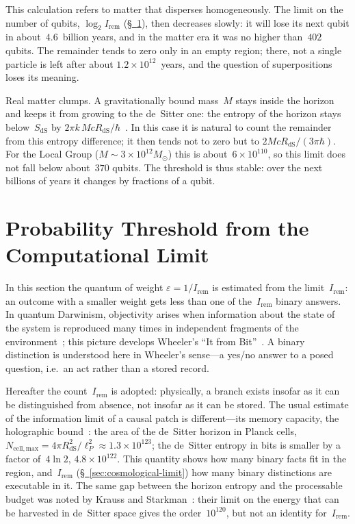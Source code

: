 \documentclass[11pt,a4paper]{article}
\newcommand{\Ost}{I_{\mathrm{rem}}}
\begin{document}
This calculation refers to matter that disperses homogeneously. The limit on the number of qubits, $\log_2\Ost$ (\hyperref[sec:computational]{\S~\ref*{sec:computational}}), then decreases slowly: it will lose its next qubit in about~$4.6$~billion years, and in the matter era it was no higher than~$402$ qubits. The remainder tends to zero only in an empty region; there, not a single particle is left after about $1.2\times10^{12}$~years, and the question of superpositions loses its meaning.

Real matter clumps. A gravitationally bound mass~$M$ stays inside the horizon and keeps it from growing to the de~Sitter one: the entropy of the horizon stays below~$S_{\mathrm{dS}}$ by $2\pi k\,McR_{\mathrm{dS}}/\hbar$~\cite{bousso2002}. In this case it is natural to count the remainder from this entropy difference; it then tends not to zero but to $2McR_{\mathrm{dS}}/(3\pi\hbar)$. For the Local Group ($M\sim3\times10^{12}M_\odot$) this is about~$6\times10^{110}$, so this limit does not fall below about~$370$ qubits. The threshold is thus stable: over the next billions of years it changes by fractions of a qubit.

\section{Probability Threshold from the Computational Limit}
\label{sec:computational}

In this section the quantum of weight $\varepsilon=1/\Ost$ is estimated from the limit~$\Ost$: an outcome with a smaller weight gets less than one of the~$\Ost$ binary answers. In quantum Darwinism, objectivity arises when information about the state of the system is reproduced many times in independent fragments of the environment~\cite{zurek2009}; this picture develops Wheeler's ``It from Bit''~\cite{wheeler1989}. A binary distinction is understood here in Wheeler's sense---a yes/no answer to a posed question, i.e.\ an act rather than a stored record.

Hereafter the count~$\Ost$ is adopted: physically, a branch exists insofar as it can be distinguished from absence, not insofar as it can be stored. The usual estimate of the information limit of a causal patch is different---its memory capacity, the holographic bound~\cite{bousso2002}: the area of the de~Sitter horizon in Planck cells, $N_{\mathrm{cell,max}}=4\pi R_{\mathrm{dS}}^2/\ell_P^2\approx1.3\times10^{123}$; the de~Sitter entropy in bits is smaller by a factor of~$4\ln2$, $4.8\times10^{122}$. This quantity shows how many binary facts fit in the region, and~$\Ost$ (\hyperref[sec:cosmological-limit]{\S~\ref*{sec:cosmological-limit}}) how many binary distinctions are executable in it. The same gap between the horizon entropy and the processable budget was noted by Krauss and Starkman~\cite{krauss2004}: their limit on the energy that can be harvested in de~Sitter space gives the order~$10^{120}$, but not an identity for~$\Ost$.
\end{document}
